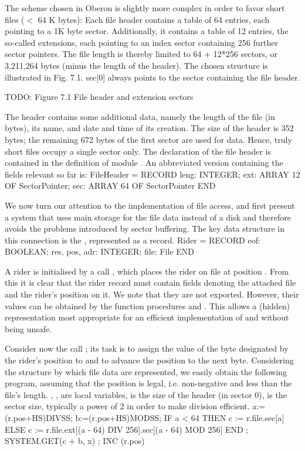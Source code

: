 The scheme chosen in Oberon is slightly more complex in order to favor short files ($<$ 64 K bytes): Each file header contains a table of 64 entries, each pointing to a 1K byte sector. Additionally, it contains a table of 12 entries, the so-called extensions, each pointing to an index sector containing 256 further sector pointers. The file length is thereby limited to 64 + 12*256 sectors, or 3,211,264 bytes (minus the length of the header). The chosen structure is illustrated in Fig. 7.1. sec[0] always points to the sector containing the file header.

TODO: Figure 7.1 File header and extension sectors

The header contains some additional data, namely the length of the file (in bytes), its name, and date and time of its creation. The size of the header is 352 bytes; the remaining 672 bytes of the first sector are used for data. Hence, truly short files occupy a single sector only. The declaration of the file header is contained in the definition of module . An abbreviated version containing the fields relevant so far is:
\begintt
FileHeader = RECORD leng: INTEGER;
ext: ARRAY 12 OF SectorPointer;
sec: ARRAY 64 OF SectorPointer END
\endtt

\noindent We now turn our attention to the implementation of file access, and first present a system that uses main storage for the file data instead of a disk and therefore avoids the problems introduced by sector buffering. The key data structure in this connection is the , represented as a record.
\begintt
Rider = RECORD
eof: BOOLEAN; res, pos, adr: INTEGER; file: File
END
\endtt

\noindent A rider is initialised by a call , which places the rider  on file  at position . From this it is clear that the rider record must contain fields denoting the attached file and the rider's position on it. We note that they are not exported. However, their values can be obtained by the function procedures  and . This allows a (hidden) representation most appropriate for an efficient implementation of  and  without being unsafe.

Consider now the call ; its task is to assign the value of the byte designated by the rider's position to  and to advance the position to the next byte. Considering the structure by which file data are represented, we easily obtain the following program, assuming that the position is legal, i.e. non-negative and less than the file's length. , ,  are local variables,  is the size of the header (in sector 0),  is the sector size, typically a power of 2 in order to make division efficient.
\begintt
a:=(r.pos+HS)DIVSS; b:=(r.pos+HS)MODSS;
IF a < 64 THEN c := r.file.sec[a]
ELSE c := r.file.ext[(a - 64) DIV 256].sec[(a - 64) MOD 256] END ;
SYSTEM.GET(c + b, x) ; INC (r.pos)
\endtt

